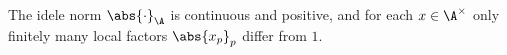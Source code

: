 The idele norm $\abs{\cdot}_\A$ is continuous and positive, and for each $x\in\A^\times$ only finitely many local factors $\abs{x_p}_p$ differ from $1$.
